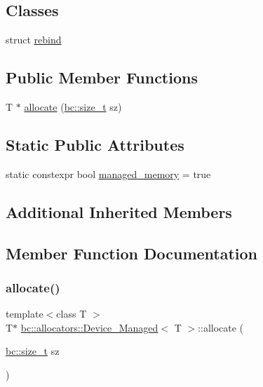 \subsection*{Classes}
\begin{DoxyCompactItemize}
\item 
struct \hyperlink{structbc_1_1allocators_1_1Device__Managed_1_1rebind}{rebind}
\end{DoxyCompactItemize}
\subsection*{Public Member Functions}
\begin{DoxyCompactItemize}
\item 
T $\ast$ \hyperlink{structbc_1_1allocators_1_1Device__Managed_a2388ef048941011079762066791b4a38}{allocate} (\hyperlink{namespacebc_aaf8e3fbf99b04b1b57c4f80c6f55d3c5}{bc\+::size\+\_\+t} sz)
\end{DoxyCompactItemize}
\subsection*{Static Public Attributes}
\begin{DoxyCompactItemize}
\item 
static constexpr bool \hyperlink{structbc_1_1allocators_1_1Device__Managed_a76f220b78bda7fc2f3c3f50645c35753}{managed\+\_\+memory} = true
\end{DoxyCompactItemize}
\subsection*{Additional Inherited Members}


\subsection{Member Function Documentation}
\mbox{\label{structbc_1_1allocators_1_1Device__Managed_a2388ef048941011079762066791b4a38}} 
\subsubsection{\texorpdfstring{allocate()}{allocate()}}
{\footnotesize\ttfamily template$<$class T $>$ \\
T$\ast$ \hyperlink{structbc_1_1allocators_1_1Device__Managed}{bc\+::allocators\+::\+Device\+\_\+\+Managed}$<$ T $>$\+::allocate (\begin{DoxyParamCaption}\item[{\hyperlink{namespacebc_aaf8e3fbf99b04b1b57c4f80c6f55d3c5}{bc\+::size\+\_\+t}}]{sz }\end{DoxyParamCaption})\hspace{0.3cm}{\ttfamily [inline]}}



